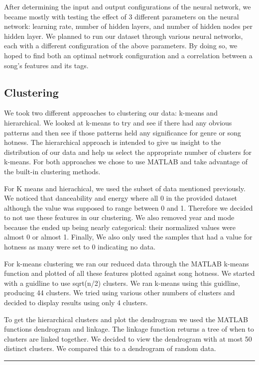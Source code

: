 \documentclass[12pt]{article}
\newcommand{\horizontalLine}{
	\begin{center}
		\hrule width 1.0\textwidth
	\end{center}
}
\begin{document}
After determining the input and output configurations of the neural network, we became mostly with testing the effect of 3 different parameters on the neural network: learning rate, number of hidden layers, and number of hidden nodes per hidden layer. We planned to run our dataset through various neural networks, each with a different configuration of the above parameters. By doing so, we hoped to find both an optimal network configuration and a correlation between a song's features and its tags. 
\subsection{Clustering}
\label{subsec:clustering}
We took two different approaches to clustering our data: k-means and hierarchical. We looked at k-means to try and see if there had any obvious patterns and then see if those patterns held any significance for genre or song hotness. The hierarchical approach is intended to give us insight to the distribution of our data and help us select the appropriate number of clusters for k-means. For both approaches we chose to use MATLAB and take advantage of the built-in clustering methods.

For K means and hierachical, we used the subset of data mentioned previously. We noticed that danceability and energy where all 0 in the provided dataset although the value was supposed to range between 0 and 1. Therefore we decided to not use these features in our clustering. We also removed year and mode because the ended up being nearly categorical: their normalized values were almost 0 or almost 1. Finally, We also only used the samples that had a value for hotness as many were set to 0 indicating no data. 

For k-means clustering we ran our reduced data through the MATLAB k-means function and plotted of all these features plotted against song hotness. We started with a guidline to use sqrt(n/2) clusters. We ran k-means using this guidline, producing 44 clusters. We tried using various other numbers of clusters and decided to display results using only 4 clusters.

To get the hierarchical clusters and plot the dendrogram we used the MATLAB functions dendrogram and linkage. The linkage function returns a tree of when to clusters are linked together. We decided to view the dendrogram with at most 50 distinct clusters. We compared this to a dendrogram of random data.
\horizontalLine
\end{document}
